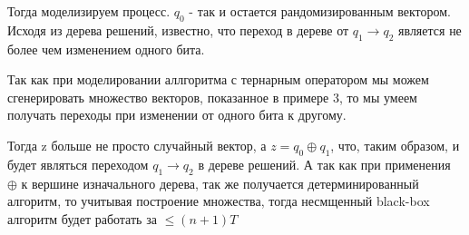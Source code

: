 Тогда моделизируем процесс. 
$q_0$ - так и остается рандомизированным вектором.
Исходя из дерева решений, известно, что переход в дереве от $q_1 \to q_2$ является не более чем изменением одного бита. 

Так как при моделировании аллгоритма с тернарным оператором мы можем сгенерировать множество векторов, показанное в примере 3, то мы умеем получать переходы при изменении от одного бита к другому. 

Тогда z больше не просто случайный вектор, а $z = q_0 \oplus q_1 $, что, таким образом, и будет являться переходом $q_1 \to q_2$ в дереве решений. А так как при применения $\oplus$ к вершине изначального дерева, так же получается детерминированный алгоритм, то учитывая построение множества, тогда несмщенный black-box алгоритм будет работать за $\leq(n + 1)T$

